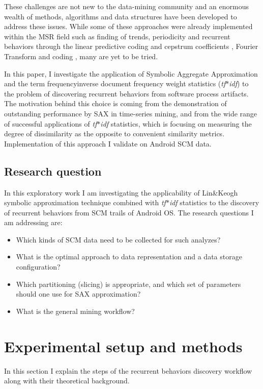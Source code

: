 \documentclass[conference]{worldcomp}
\begin{document}
These challenges are not new to the data-mining community and an enormous wealth 
of methods, algorithms and data structures have been developed to address these issues.
While some of these approaches were already implemented within the MSR field \cite{citeulike:7853299}  
such as finding of trends, periodicity and recurrent behaviors through the linear 
predictive coding and cepstrum coefficients \cite{citeulike:3378725}, 
Fourier Transform \cite{citeulike:10377345} and coding \cite{citeulike:10377366},
many are yet to be tried.

In this paper, I investigate the application of 
Symbolic Aggregate Approximation \cite{citeulike:2821475} and the 
term frequency\textendash inverse document frequency weight statistics (\textit{tf$\ast$idf})
\cite{citeulike:3056638} to the problem of discovering recurrent 
behaviors from software process artifacts. The motivation behind this choice is coming
from the demonstration of outstanding performance by SAX in time-series mining, 
and from the wide range of successful applications of \textit{tf$\ast$idf} 
statistics, which is focusing on measuring the degree of dissimilarity 
as the opposite to convenient similarity metrics. Implementation of this approach I 
validate on Android SCM data.

\subsection{Research question}
In this exploratory work I am investigating the applicability of Lin\&Keogh 
symbolic approximation technique combined with \textit{tf$\ast$idf} statistics to the discovery of 
recurrent behaviors from SCM trails of Android OS.
The research questions I am addressing are: 
\begin{itemize}
 \item Which kinds of SCM data need to be collected for such analyzes?
 \item What is the optimal approach to data representation and a data storage configuration?
 \item Which partitioning (slicing) is appropriate, and which set of parameters should one use for SAX approximation?
 \item What is the general mining workflow?
\end{itemize}

\section{Experimental setup and methods}
In this section I explain the steps of the recurrent behaviors discovery workflow 
along with their theoretical background.
\end{document}
